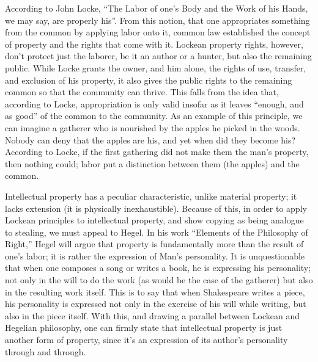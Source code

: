 \documentclass[12pt,letterpaper]{article}
\begin{document}
According to John Locke, ``The Labor of one's Body and the Work of his Hands, we may say, are properly his''\autocite[\ppno~287]{locke-1988}. From this notion, that one appropriates something from the common by applying labor onto it, common law established the concept of property and the rights that come with it. Lockean property rights, however, don't protect just the laborer, be it an author or a hunter, but also the remaining public. While Locke grants the owner, and him alone, the rights of use, transfer, and exclusion of his property, it also gives the public rights to the remaining common so that the community can thrive\cite[\ppno~119]{favale-2014}. This falls from the idea that, according to Locke, appropriation is only valid insofar as it leaves ``enough, and as good''\autocite[\ppno~291]{locke-1988} of the common to the community. As an example of this principle, we can imagine a gatherer who is nourished by the apples he picked in the woods. Nobody can deny that the apples are his, and yet when did they become his? According to Locke, if the first gathering did not make them the man's property, then nothing could; labor put a distinction between them (the apples) and the common\autocite[\ppno~288]{locke-1988}.

Intellectual property has a peculiar characteristic, unlike material property; it lacks extension (it is physically inexhaustible). Because of this, in order to apply Lockean principles to intellectual property, and show copying as being analogue to stealing, we must appeal to Hegel. In his work ``Elements of the Philosophy of Right,'' Hegel will argue that property is fundamentally more than the result of one's labor; it is rather the expression of Man's personality\autocite[\ppno~84--88]{hegel-1991}. It is unquestionable that when one composes a song or writes a book, he is expressing his personality; not only in the will to do the work (as would be the case of the gatherer) but also in the resulting work itself. This is to say that when Shakespeare writes a piece, his personality is expressed not only in the exercise of his will while writing, but also in the piece itself. With this, and drawing a parallel between Lockean and Hegelian philosophy, one can firmly state that intellectual property is just another form of property, since it's an expression of its author's personality through and through.
\end{document}
